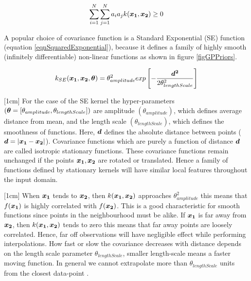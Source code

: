 \begin{equation}\label{equationPDKernel}
\sum_{i=1}^{N}\sum_{j=1}^{N}a_{i}a_{j}k(\boldsymbol{x_1},\boldsymbol{x_2}) \geq 0
\end{equation}

A popular choice of covariance function is a Standard Exponential (SE) function (equation \ref{eqnSquaredExponential}), because it defines a family of highly smooth (infinitely differentiable) non-linear functions as shown in figure \ref{figGPPriors}.

\begin{equation}\label{eqnSquaredExponential}
k_{SE}(\boldsymbol{x_1}, \boldsymbol{x_2}, \boldsymbol{\theta}) = \theta_{amplitude}^2exp \left [-\frac{\boldsymbol{d^2}}{2\theta_{lengthScale}^2} \right ]
\end{equation}

[1cm]
For the case of the SE kernel the hyper-parameters $(\boldsymbol{\theta} = [\theta_{amplitude}, \theta_{lengthScale}])$ are amplitude $(\theta_{amplitude})$, which defines average distance from mean, and the length scale $(\theta_{lengthScale})$, which defines the smoothness of functions. Here, $\boldsymbol{d}$ defines the absolute distance between points ($\boldsymbol{d} = |\boldsymbol{x_1}-\boldsymbol{x_2}|$). Covariance functions which are purely a function of distance $\boldsymbol{d}$ are called isotropic stationary functions. These covariance functions remain unchanged if the points $\boldsymbol{x_{1}}, \boldsymbol{x_{2}}$ are rotated or translated. Hence a family of functions defined by stationary kernels will have similar local features throughout the input domain. 

[1cm]
When $\boldsymbol{x_1}$ tends to $\boldsymbol{x_2}$, then $k(\boldsymbol{x_1}, \boldsymbol{x_2})$ approaches $\theta_{amplitude}^{2}$ this means that $f(\boldsymbol{x_1})$ is highly correlated with $f(\boldsymbol{x_2})$. This is a good characteristic for smooth functions since points in the neighbourhood must be alike. If $\boldsymbol{x_1}$ is far away from  $\boldsymbol{x_2}$, then $k(\boldsymbol{x_1}, \boldsymbol{x_2})$ tends to zero this means that far away points are loosely correlated. Hence, far off observations will have negligible effect while performing interpolations. How fast or slow the covariance decreases with distance depends on the length scale parameter $\theta_{lengthScale}$, smaller length-scale means a faster moving function. In general we cannot extrapolate more than $\theta_{lengthScale}$ units from the closest data-point \cite{duvenaud-thesis-2014}. 

